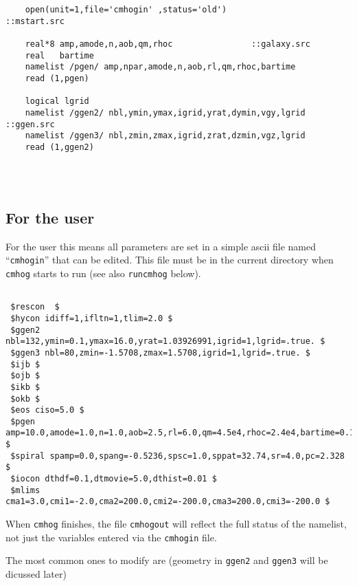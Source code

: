 \documentclass[11pt]{article}
\begin{document}
\begin{verbatim}
    open(unit=1,file='cmhogin' ,status='old')                     ::mstart.src

    real*8 amp,amode,n,aob,qm,rhoc				  ::galaxy.src
    real   bartime
    namelist /pgen/ amp,npar,amode,n,aob,rl,qm,rhoc,bartime       
    read (1,pgen)                                                 

    logical lgrid
    namelist /ggen2/ nbl,ymin,ymax,igrid,yrat,dymin,vgy,lgrid	  ::ggen.src
    namelist /ggen3/ nbl,zmin,zmax,igrid,zrat,dzmin,vgz,lgrid
    read (1,ggen2)




\end{verbatim}

\subsection{For the user}

For the user this means all parameters are set in a simple ascii file
named ``{\tt cmhogin}'' that can be edited. This file must be in the
current directory when {\tt cmhog} starts to run (see also
{\tt runcmhog} below).

\begin{verbatim}

 $rescon  $
 $hycon idiff=1,ifltn=1,tlim=2.0 $
 $ggen2 nbl=132,ymin=0.1,ymax=16.0,yrat=1.03926991,igrid=1,lgrid=.true. $
 $ggen3 nbl=80,zmin=-1.5708,zmax=1.5708,igrid=1,lgrid=.true. $
 $ijb $
 $ojb $
 $ikb $
 $okb $
 $eos ciso=5.0 $
 $pgen amp=10.0,amode=1.0,n=1.0,aob=2.5,rl=6.0,qm=4.5e4,rhoc=2.4e4,bartime=0.1 $
 $spiral spamp=0.0,spang=-0.5236,spsc=1.0,sppat=32.74,sr=4.0,pc=2.328 $
 $iocon dthdf=0.1,dtmovie=5.0,dthist=0.01 $
 $mlims cma1=3.0,cmi1=-2.0,cma2=200.0,cmi2=-200.0,cma3=200.0,cmi3=-200.0 $

\end{verbatim}

When {\tt cmhog} finishes, the file {\tt cmhogout} will reflect the full
status of the namelist, not just the variables entered via the {\tt cmhogin}
file.

The most common ones to modify are (geometry in {\tt ggen2} and {\tt ggen3}
will be dicussed later)
\end{document}
